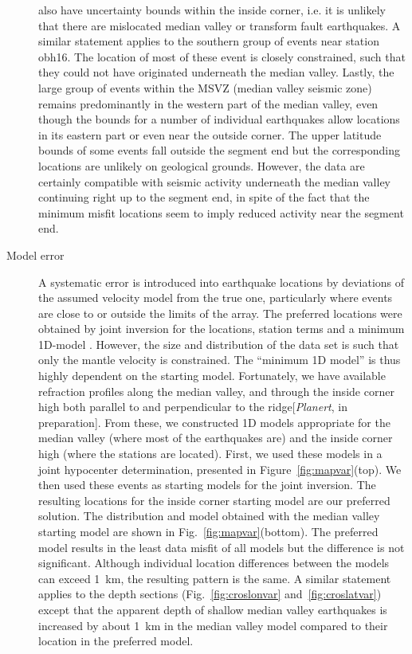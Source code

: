 \documentclass[jgr]{aguplus}
\newlength{\tw}
\begin{document}
\begin{article}
\begin{description}
also have uncertainty bounds within the inside corner, i.e. it is unlikely
that there are mislocated median valley or transform fault
earthquakes.  A similar statement applies to the southern group of
events near station obh16.  The location of most of these event is
closely constrained, such that they could not have originated underneath
the median valley.   Lastly, the large group of events within the MSVZ
(median valley seismic zone) remains predominantly in the western part of the median
valley, even though the bounds for a number of individual earthquakes
allow locations in its eastern part or even near the outside corner.
The upper latitude bounds of
some events fall outside the segment end but the corresponding locations are
unlikely on geological grounds.  However, the data are certainly
compatible with seismic activity underneath the
median valley continuing right up to the segment end, in spite of the
fact that the minimum misfit locations seem to imply reduced activity
near the segment end.

\item[Model error]
A systematic error is introduced into earthquake locations by
deviations of the assumed velocity model from the true one, particularly where
events are close to or outside the limits of the array.  The preferred
locations were obtained by joint inversion for the locations,
station terms and a minimum 1D-model \citep[using
VELEST][]{kissling94}. However, the size and distribution of the data
set is such that only the mantle velocity is constrained.
The ``minimum 1D model'' is thus highly dependent on the starting
model.  Fortunately, we have available refraction profiles along the median
valley, and through the inside corner high both parallel to and
perpendicular to the ridge[{\it Planert},
in preparation].  From these, we constructed 1D models appropriate for
the median valley (where most of the earthquakes are) and the inside
corner high (where the stations are located).  First, we used these
models in a joint hypocenter determination, presented in Figure~\ref{fig:mapvar}(top).
We then used these
events as starting models for the joint inversion. The resulting
locations for the inside corner starting model are our preferred
solution. The distribution and model obtained with the median valley
starting model are shown in Fig.~\ref{fig:mapvar}(bottom).  The
preferred model results in the least data misfit of all models but the
difference is not significant.  Although individual location
differences between the models can exceed 1~km, the resulting pattern
is the same.  A similar statement applies to the depth sections
(Fig.~\ref{fig:croslonvar} and~\ref{fig:croslatvar}) except that the
apparent depth of shallow median valley earthquakes is
increased by about 1~km in the median valley model compared to their
location in the preferred model.


\end{description}
\end{article}
\end{document}

